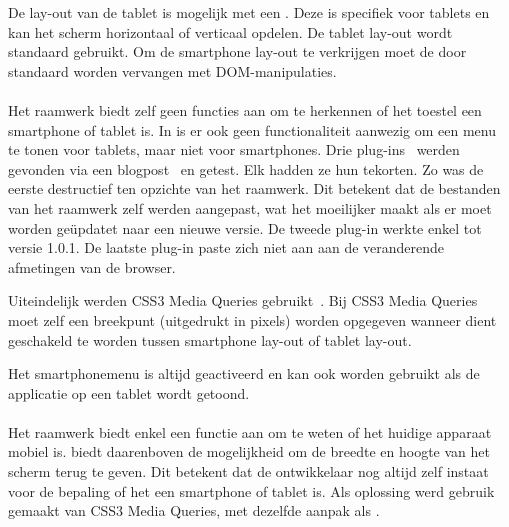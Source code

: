 De lay-out van de tablet is mogelijk met een .
Deze  is specifiek voor tablets en kan het scherm horizontaal of verticaal opdelen.
De tablet lay-out wordt standaard gebruikt.
Om de smartphone lay-out te verkrijgen moet de  door standaard  worden vervangen met DOM-manipulaties.

\paragraph{\jqm}
Het raamwerk biedt zelf geen functies aan om te herkennen of het toestel een smartphone of tablet is.
In \jqm{} is er ook geen functionaliteit aanwezig om een menu te tonen voor tablets, maar niet voor smartphones. 
Drie plug-ins~\cite{Rahman2013,Yared2013,Franck2012} werden gevonden via een blogpost~\cite{Deering2012} en getest.
Elk hadden ze hun tekorten. 
Zo was de eerste destructief ten opzichte van het raamwerk.
Dit betekent dat de bestanden van het raamwerk zelf werden aangepast, wat het moeilijker maakt als er moet worden geüpdatet naar een nieuwe versie. 
De tweede plug-in werkte enkel tot versie 1.0.1.
De laatste plug-in paste zich niet aan aan de veranderende afmetingen van de browser. 

Uiteindelijk werden CSS3 Media Queries gebruikt~\cite{Hadlock2012,JQuery2013e}. 
Bij CSS3 Media Queries moet zelf een breekpunt (uitgedrukt in pixels) worden opgegeven wanneer dient geschakeld te worden tussen smartphone lay-out of tablet lay-out.

Het smartphonemenu is altijd geactiveerd en kan ook worden gebruikt als de applicatie op een tablet wordt getoond.

\paragraph{\lungo}
Het raamwerk biedt enkel een functie aan om te weten of het huidige apparaat mobiel is.
\quo{} biedt daarenboven de mogelijkheid om de breedte en hoogte van het scherm terug te geven.
Dit betekent dat de ontwikkelaar nog altijd zelf instaat voor de bepaling of het een smartphone of tablet is.
Als oplossing werd gebruik gemaakt van CSS3 Media Queries, met dezelfde aanpak als \jqm{}.

